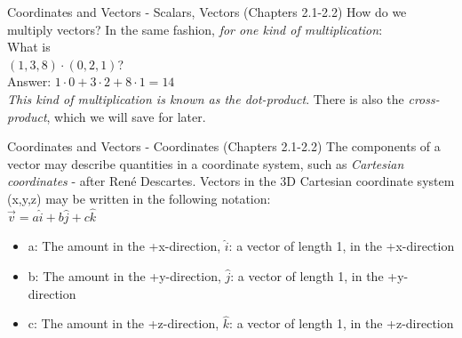 \documentclass{beamer}
\begin{document}
\begin{frame}{Coordinates and Vectors - Scalars, Vectors (Chapters 2.1-2.2)}
How do we multiply vectors? In the same fashion, \textit{for one kind of multiplication}:\\
\vspace{0.5cm}
What is\\
$(1,3,8)\cdot (0,2,1)$? \\
Answer: $1\cdot 0 + 3 \cdot 2 + 8 \cdot 1 = 14$ \\
\vspace{0.5cm}
\textit{This kind of multiplication is known as the dot-product}.  There is also the \textit{cross-product}, which we will save for later.
\end{frame}

\begin{frame}{Coordinates and Vectors - Coordinates (Chapters 2.1-2.2)}
\small
The components of a vector may describe quantities in a \alert{coordinate system}, such as \textit{Cartesian coordinates} - after Ren\'e Descartes.  Vectors in the 3D Cartesian coordinate system (x,y,z) may be written in the following notation:
\\
\vspace{0.2cm}
$\boxed{\vec{v} = a\hat{i} + b\hat{j} + c\hat{k}}$
\\
\begin{itemize}
\item a: The amount in the +x-direction, $\hat{i}$: a vector of length 1, in the +x-direction
\item b: The amount in the +y-direction, $\hat{j}$: a vector of length 1, in the +y-direction
\item c: The amount in the +z-direction, $\hat{k}$: a vector of length 1, in the +z-direction
\end{itemize}
\end{frame}
\end{document}
